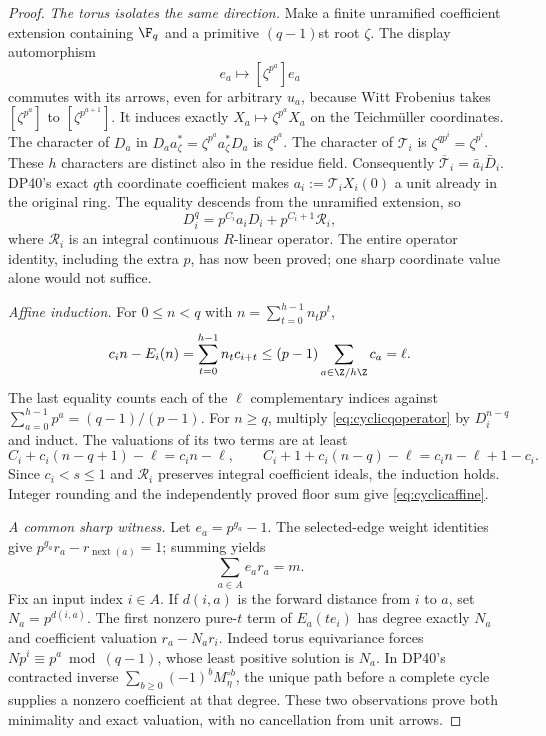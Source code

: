 \begin{proof}
\emph{The torus isolates the same direction.}
Make a finite unramified coefficient extension containing $\F_q$ and a primitive $(q-1)$st root $\zeta$. The display automorphism
\[
 e_a\longmapsto[\zeta^{p^a}]e_a
\]
commutes with its arrows, even for arbitrary $u_a$, because Witt Frobenius takes $[\zeta^{p^a}]$ to $[\zeta^{p^{a+1}}]$. It induces exactly $X_a\mapsto\zeta^{p^a}X_a$ on the Teichm\"uller coordinates.
The character of $D_a$ in
$D_aa_\zeta^*=\zeta^{p^a}a_\zeta^*D_a$ is $\zeta^{p^a}$.
The character of $\mathscr T_i$ is $\zeta^{qp^i}=\zeta^{p^i}$.
These $h$ characters are distinct also in the residue field. Consequently
$\overline{\mathscr T}_i=\bar a_i\bar D_i$.
DP40's exact $q$th coordinate coefficient makes
$a_i:=\mathscr T_iX_i(0)$ a unit already in the original ring.
The equality descends from the unramified extension, so
\begin{equation}\label{eq:cyclicqoperator}
 D_i^q=p^{C_i}a_iD_i+p^{C_i+1}\mathscr R_i,
\end{equation}
where $\mathscr R_i$ is an integral continuous $R$-linear operator. The entire operator identity, including the extra $p$, has now been proved; one sharp coordinate value alone would not suffice.

\emph{Affine induction.}
For $0\le n<q$ with $n=\sum_{t=0}^{h-1}n_tp^t$,
\[
 c_in-E_i(n)=\sum_{t=0}^{h-1}n_tc_{i+t}
       \le(p-1)\sum_{a\in\Z/h\Z}c_a=\ell.
\]
The last equality counts each of the $\ell$ complementary indices against
$\sum_{a=0}^{h-1}p^a=(q-1)/(p-1)$.
For $n\ge q$, multiply \eqref{eq:cyclicqoperator} by $D_i^{n-q}$ and induct. The valuations of its two terms are at least
\[
 C_i+c_i(n-q+1)-\ell=c_in-\ell,\qquad
 C_i+1+c_i(n-q)-\ell=c_in-\ell+1-c_i.
\]
Since $c_i<s\le1$ and $\mathscr R_i$ preserves integral coefficient ideals, the induction holds. Integer rounding and the independently proved floor sum give \eqref{eq:cyclicaffine}.

\emph{A common sharp witness.}
Let $e_a=p^{g_a}-1$. The selected-edge weight identities give
$p^{g_a}r_a-r_{\operatorname{next}(a)}=1$; summing yields
\[
 \sum_{a\in A}e_ar_a=m.
\]
Fix an input index $i\in A$. If $d(i,a)$ is the forward distance from $i$ to $a$, set $N_a=p^{d(i,a)}$.
The first nonzero pure-$t$ term of $E_a(te_i)$ has degree exactly $N_a$ and coefficient valuation $r_a-N_ar_i$.
Indeed torus equivariance forces $Np^i\equiv p^a\bmod(q-1)$, whose least positive solution is $N_a$.
In DP40's contracted inverse $\sum_{b\ge0}(-1)^bM_\eta^{\circ b}$, the unique path before a complete cycle supplies a nonzero coefficient at that degree.
These two observations prove both minimality and exact valuation, with no cancellation from unit arrows.


\end{proof}
